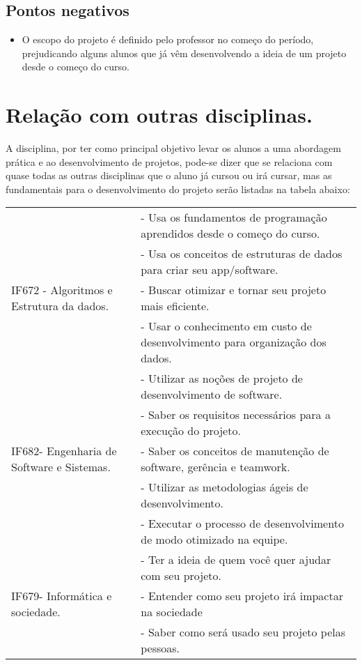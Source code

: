 \documentclass[a4paper]{article}
\begin{document}
\subsection{Pontos negativos}
\begin{itemize}
\item O escopo do projeto é definido pelo professor no começo do período, prejudicando alguns alunos que já vêm desenvolvendo a ideia de um projeto desde o começo do curso.
\end{itemize}


\section{Relação com outras disciplinas.}

A disciplina, por ter como principal objetivo levar os alunos a uma abordagem prática e ao desenvolvimento de projetos, pode-se dizer que se relaciona com quase todas as outras disciplinas que o aluno já cursou ou irá cursar, mas as fundamentais para o desenvolvimento do projeto serão listadas na tabela abaixo:

\begin{table}[ht]
\centering
\begin{tabular}{|l|l|}
\hline
\multicolumn{1}{|l|}{} & \multicolumn{1}{l|}{- Usa os fundamentos de programação aprendidos desde o começo do curso.} \\ \cline{2-2}
 & -  Usa os conceitos de estruturas de dados para criar seu app/software. \\ \cline{2-2}
IF672 - Algoritmos e Estrutura da dados. & - Buscar otimizar e tornar seu projeto mais eficiente.\\ \cline{2-2}
 & - Usar o conhecimento em custo de desenvolvimento para organização dos dados. \\ \cline{2-2}
  \cline{1-1}              
 &- Utilizar as noções de projeto de desenvolvimento de software. \\ \cline{2-2}
 & - Saber os requisitos necessários para a execução do projeto.\\ \cline{2-2}
IF682- Engenharia de Software e Sistemas. & -  Saber os conceitos de manutenção de software, gerência e teamwork. \\ \cline{2-2}
 & -  Utilizar as metodologias ágeis de desenvolvimento.\\ \cline{2-2}
  & - Executar o processo de desenvolvimento de modo otimizado na equipe.\\ \cline{2-2}
  \cline{1-1}              
 & - Ter a ideia de quem você quer ajudar com seu projeto. \\ \cline{2-2}
IF679- Informática e sociedade. & - Entender como seu projeto irá impactar na sociedade \\ \cline{2-2}
 & - Saber como será usado seu projeto pelas pessoas.\\ \cline{2-2}
  \cline{2-2}
  \cline{1-1}   
  
\end{tabular}
\end{table}

\newpage


\end{document}

